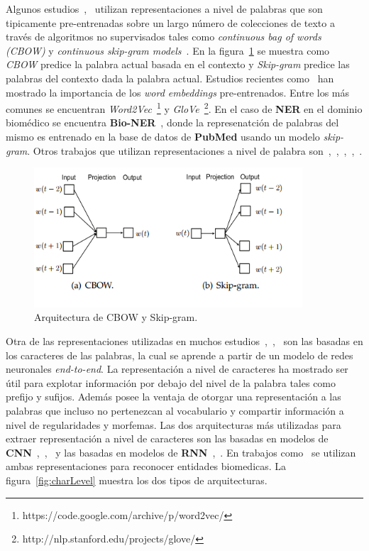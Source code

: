 Algunos estudios~\cite{nguyen2016toward},~\cite{strubell2017fast} utilizan representaciones a nivel de palabras que son tipicamente pre-entrenadas sobre un largo n\'umero de colecciones de texto a trav\'es de algoritmos no supervisados tales como \emph{continuous bag of words (CBOW)} y \emph{continuous skip-gram models}~\cite{mikolov2013efficient}. En la figura~\ref{fig:cbowSkip} se muestra como \emph{CBOW} predice la palabra actual basada en el contexto y \emph{Skip-gram} predice las palabras del contexto dada la palabra actual. Estudios recientes como~\cite{yang2018design} han mostrado la importancia de los \emph{word embeddings} pre-entrenados. Entre los m\'as comunes se encuentran \emph{Word2Vec}~\footnote{https://code.google.com/archive/p/word2vec/} y \emph{GloVe}~\footnote{http://nlp.stanford.edu/projects/glove/}. En el caso de \textbf{NER} en el dominio biom\'edico se encuentra \textbf{Bio-NER}~\cite{yao2015biomedical}, donde la represenatci\'on de palabras del mismo es entrenado en la base de datos de \textbf{PubMed} usando un modelo \emph{skip-gram}. Otros trabajos que utilizan  representaciones a nivel de palabra son~\cite{zhai2017neural},~\cite{zhou2017joint},~\cite{ma2016end},~\cite{li2017leveraging},~\cite{wang2018code}.

\begin{figure}[h!]
	\centering
	\includegraphics[width = 10cm]{Imagenes/CBOW_SkipGram.png}
	\caption{Arquitectura de CBOW y Skip-gram.}\label{fig:cbowSkip}
\end{figure}


Otra de las representaciones utilizadas en muchos estudios~\cite{kuru2016charner},~\cite{tran2017named},~\cite{li2018segbot} son las basadas en los caracteres de las palabras, la cual se aprende a partir de un modelo de redes neuronales \emph{end-to-end}. La representaci\'on a nivel de caracteres ha mostrado ser \'util para explotar informaci\'on por debajo del nivel de la palabra tales como prefijo y sufijos. Adem\'as posee la ventaja de otorgar una representaci\'on a las palabras que incluso no pertenezcan al vocabulario y compartir informaci\'on a nivel de regularidades y morfemas. Las dos arquitecturas m\'as utilizadas para extraer representaci\'on a nivel de caracteres son las basadas en modelos de \textbf{CNN}~\cite{ma2016end},~\cite{li2017leveraging},~\cite{yang2017neural} y las basadas en modelos de \textbf{RNN}~\cite{lample2016neural},~\cite{kuru2016charner}. En trabajos como~\cite{gridach2017character} se utilizan ambas representaciones para reconocer entidades biomedicas. La figura~\ref{fig:charLevel} muestra los dos tipos de arquitecturas.

